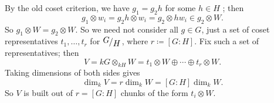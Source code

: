 \documentclass[12pt]{article}
\newcommand{\quotient}[2]{{\makebox[\width-2.3pt][l]{\raisebox{.2em}{$#1$}}\left/\raisebox{-.2em}{$#2$}\right.}}
\theoremstyle{definition}
\begin{document}
By the old coset criterion, we have $g_1 = g_2 h$ for some $h \in H$ ; then 
\begin{equation}
    g_1 \otimes w_i = g_2 h \otimes w_i = g_2 \otimes h w_i \in g_2 \otimes W.
\end{equation}
So $g_1 \otimes W = g_2 \otimes W$. So we need not consider all $g \in G$, just a set of coset representatives $t_1 , \dotsc , t_r$ for $\quotient{G}{H}$, where $r \coloneqq  [G : H]$. Fix such a set of representatives; then 
\begin{equation}
    V = kG \otimes_{kH} W = t_1 \otimes W \oplus \dotsb \oplus t_r \otimes W.
\end{equation}
Taking dimensions of both sides gives 
\begin{equation}
    \dim_k V = r \dim_k W = \boxed{[G : H] \dim_k W.}
\end{equation}
So $V$ is built out of $r = [G : H]$ chunks of the form $t_i \otimes W$.
\end{document}
